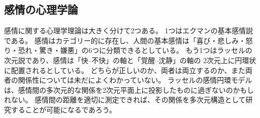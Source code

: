 
\subsection{感情の心理学論}
\label{sec:PsychoEmo}
感情に関する心理学理論は大きく分けて2つある。
1つはエクマンの基本感情説\cite{ekman1992argument}である。
感情はカテゴリー的に存在し、人間の基本感情は「喜び・悲しみ・怒り・恐れ・驚き・嫌悪」の6つに分類できるとしている。
もう1つはラッセルの次元説\cite{russell1980circumplex}であり、感情は「快--不快」の軸と「覚醒--沈静」の軸の
2次元上に円環状に配置されるとしている。
どちらが正しいのか、両者は両立するのか、また両者の関係性については未だによくわかっていない。
ラッセルの感情円環モデルは、感情間の多次元的な関係を2次元平面上に投影したものに過ぎないのかもしれない。
感情間の距離を適切に測定できれば、その関係を多次元構造として研究することが可能になるであろう。


